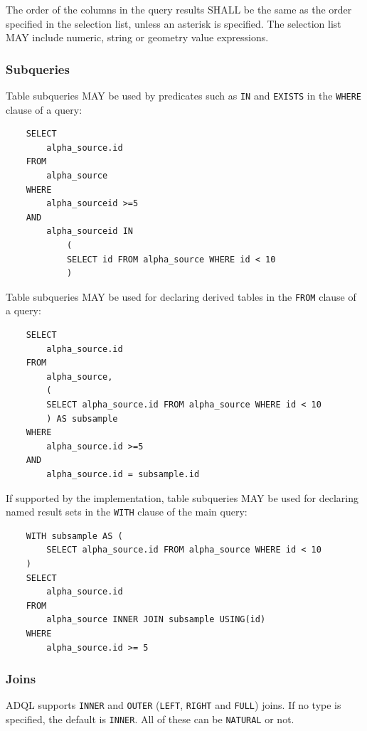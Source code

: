 \documentclass[11pt,a4paper]{ivoa}
\begin{document}
The order of the columns in the query results SHALL be the same as the
order specified in the selection list,
unless an asterisk is specified.
The selection list MAY include numeric,
string or geometry value expressions.

\subsubsection{Subqueries}
\label{sec:subqueries}

Table subqueries MAY be used by predicates such as \verb:IN: and \verb:EXISTS:
in the \verb:WHERE: clause of a query:

\begin{verbatim}
    SELECT
        alpha_source.id
    FROM 
        alpha_source
    WHERE
        alpha_sourceid >=5
    AND
        alpha_sourceid IN 
            (
            SELECT id FROM alpha_source WHERE id < 10
            )
\end{verbatim}

Table subqueries MAY be used for declaring derived tables in the \verb:FROM: clause
of a query:

\begin{verbatim}
    SELECT
        alpha_source.id
    FROM
        alpha_source,
        (
        SELECT alpha_source.id FROM alpha_source WHERE id < 10
        ) AS subsample
    WHERE
        alpha_source.id >=5
    AND
        alpha_source.id = subsample.id
\end{verbatim}

If supported by the implementation, table subqueries MAY be used for declaring
named result sets in the \verb:WITH: clause of the main query:

\begin{verbatim}
    WITH subsample AS (
        SELECT alpha_source.id FROM alpha_source WHERE id < 10
    )
    SELECT
        alpha_source.id
    FROM
        alpha_source INNER JOIN subsample USING(id)
    WHERE
        alpha_source.id >= 5
\end{verbatim}

\subsubsection{Joins}
\label{sec:joins}

ADQL supports \verb:INNER: and \verb:OUTER:
(\verb:LEFT:, \verb:RIGHT: and \verb:FULL:) joins. If no type is specified, the
default is \verb:INNER:. All of these can be \verb:NATURAL: or not.
\end{document}
